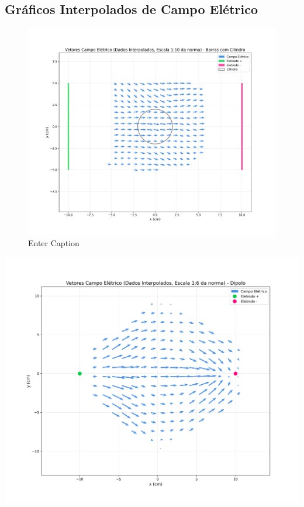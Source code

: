 \documentclass[column,brazilian,12pt,a4paper,final]{article}
\begin{document}
\justifying 

\subsection{Gráficos Interpolados de Campo Elétrico }
    \centering
    
    \centering
    \begin{minipage}{0.8\textwidth}
\begin{figure}
            \centering
            \includegraphics[width=0.5\linewidth]{Campo Cilindro.png}
            \caption{Enter Caption}
            \label{fig:enter-label}
        \end{figure}
                \centering
        \includegraphics[width=\linewidth]{Campo Dipolo .png}
        \label{fig:imagem1}
    \end{minipage}
    \hfill
\end{document}
